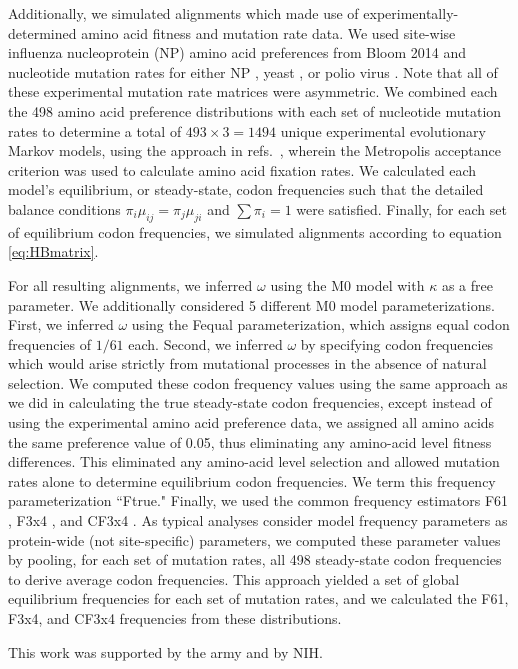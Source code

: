 \documentclass{pnastwo}
\begin{document}
\begin{article}
Additionally, we simulated alignments which made use of experimentally-determined amino acid fitness and mutation rate data. We used site-wise influenza nucleoprotein (NP) amino acid preferences from Bloom 2014 \cite{Bloom2014a} and nucleotide mutation rates for either NP \cite{Bloom2014a}, yeast \cite{Zhu2014}, or polio virus \cite{Acevedo2014}. Note that all of these experimental mutation rate matrices were asymmetric. We combined each the 498 amino acid preference distributions with each set of nucleotide mutation rates to determine a total of $493 \times 3 = 1494$ unique experimental evolutionary Markov models, using the approach in refs.\ \cite{Bloom2014a,Bloom2014b}, wherein the Metropolis acceptance criterion \cite{Metropolis1953} was used to calculate amino acid fixation rates. We calculated each model's equilibrium, or steady-state, codon frequencies such that the detailed balance conditions $\pi_i\mu_{ij} = \pi_j\mu_{ji}$ and $\sum\pi_i = 1$ were satisfied. Finally, for each set of equilibrium codon frequencies, we simulated alignments according to equation \eqref{eq:HBmatrix}.

For all resulting alignments, we inferred $\omega$ using the M0 model with $\kappa$ as a free parameter. We additionally considered 5 different M0 model parameterizations. First, we inferred $\omega$ using the Fequal \cite{Yang2006} parameterization, which assigns equal codon frequencies of $1/61$ each. Second, we inferred $\omega$ by specifying codon frequencies which would arise strictly from mutational processes in the absence of natural selection. We computed these codon frequency values using the same approach as we did in calculating the true steady-state codon frequencies, except instead of using the experimental amino acid preference data, we assigned all amino acids the same preference value of 0.05, thus eliminating any amino-acid level fitness differences. This eliminated any amino-acid level selection and allowed mutation rates alone to determine equilibrium codon frequencies. We term this frequency parameterization ``Ftrue." Finally, we used the common frequency estimators F61 \cite{GoldmanYang1994}, F3x4 \cite{MuseGaut1994}, and CF3x4 \cite{Pond2010}. As typical analyses consider model frequency parameters as protein-wide (not site-specific) parameters, we computed these parameter values by pooling, for each set of mutation rates, all 498 steady-state codon frequencies to derive average codon frequencies. This approach yielded a set of global equilibrium frequencies for each set of mutation rates, and we calculated the F61, F3x4, and CF3x4 frequencies from these distributions.


\begin{acknowledgments}
This work was supported by the army and by NIH.
\end{acknowledgments}







\end{article}
	
\end{document}
